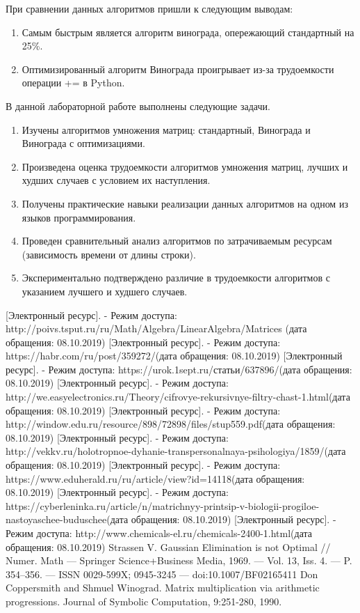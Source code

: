 \documentclass[a4paper,14pt]{article} %
\begin{document}
	\hfill
	
	При сравнении данных алгоритмов пришли к следующим выводам:
	\begin{enumerate}
 		\item Самым быстрым  является алгоритм винограда, опережающий стандартный на 25\%. 
 		\item Оптимизированный алгоритм Винограда проигрывает из-за трудоемкости операции += в Python. 
	\end{enumerate}
	
	\hfill
	
	В данной лабораторной работе выполнены следующие задачи. 
        \begin{enumerate} 
		\item Изучены алгоритмов умножения матриц: стандартный, Винограда и Винограда с оптимизациями. 
		\item Произведена оценка трудоемкости алгоритмов умножения матриц, лучших и худших случаев с условием их наступления. 
		\item Получены практические навыки реализации данных алгоритмов на одном из языков программирования. 
		\item Проведен сравнительный анализ алгоритмов по затрачиваемым ресурсам (зависимость времени от длины строки). 
		\item Экспериментально подтверждено различие в трудоемкости алгоритмов с указанием лучшего и худшего случаев. 
	\end{enumerate}
        

 	\newpage

        \begin{thebibliography}{}
        		\bibitem{} [Электронный ресурс]. - Режим доступа: http://poivs.tsput.ru/ru/Math/Algebra/LinearAlgebra/Matrices (дата обращения: 08.10.2019)
		\bibitem{}  [Электронный ресурс]. - Режим доступа: https://habr.com/ru/post/359272/(дата обращения: 08.10.2019)
		\bibitem{}  [Электронный ресурс]. - Режим доступа: https://urok.1sept.ru/статьи/637896/(дата обращения: 08.10.2019)
		\bibitem{}  [Электронный ресурс]. - Режим доступа: http://we.easyelectronics.ru/Theory/cifrovye-rekursivnye-filtry-chast-1.html(дата обращения: 08.10.2019)
		\bibitem{}  [Электронный ресурс]. - Режим доступа: http://window.edu.ru/resource/898/72898/files/stup559.pdf(дата обращения: 08.10.2019)
		\bibitem{}  [Электронный ресурс]. - Режим доступа: http://vekkv.ru/holotropnoe-dyhanie-transpersonalnaya-psihologiya/1859/(дата обращения: 08.10.2019)
		\bibitem{} [Электронный ресурс]. - Режим доступа:  https://www.eduherald.ru/ru/article/view?id=14118(дата обращения: 08.10.2019)
		\bibitem{}  [Электронный ресурс]. - Режим доступа: https://cyberleninka.ru/article/n/matrichnyy-printsip-v-biologii-progiloe-nastoyaschee-buduschee(дата обращения: 08.10.2019)
		\bibitem{}  [Электронный ресурс]. - Режим доступа: http://www.chemicals-el.ru/chemicals-2400-1.html(дата обращения: 08.10.2019)
		\bibitem{} Strassen V. Gaussian Elimination is not Optimal // Numer. Math — Springer Science+Business Media, 1969. — Vol. 13, Iss. 4. — P. 354–356. — ISSN 0029-599X; 0945-3245 — doi:10.1007/BF02165411
		\bibitem{} Don Coppersmith and Shmuel Winograd. Matrix multiplication via arithmetic progressions. Journal of Symbolic Computation, 9:251-280, 1990.
	\end{thebibliography} 
\end{document}
